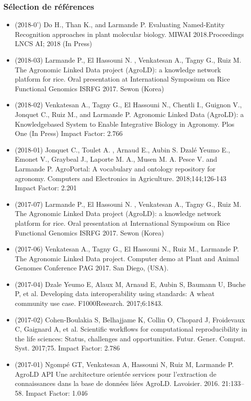 \subsubsection*{Sélection de références} 
\begin{itemize}
\item (2018-0') Do H., Than K., and Larmande P. Evaluating Named-Entity Recognition approaches in plant molecular biology. MIWAI 2018.Proceedings LNCS AI; 2018 (In Press)
\item (2018-03) Larmande P., El Hassouni N. , Venkatesan A., Tagny G., Ruiz M. The Agronomic Linked Data project (AgroLD): a knowledge network platform for rice. Oral presentation at International Symposium on Rice Functional Genomics ISRFG 2017. Sewon (Korea)
\item  (2018-02) Venkatesan A., Tagny G., El Hassouni N., Chentli I., Guignon V., Jonquet C., Ruiz M., and Larmande P. Agronomic Linked Data (AgroLD): a Knowledge\-based System to Enable Integrative Biology in Agronomy. Plos One (In Press) Impact Factor: 2.766
\item (2018-01) Jonquet C.,  Toulet A. , Arnaud E.,  Aubin S. {Dzal{\'{e}} Yeumo} E., Emonet V., Graybeal J., Laporte M. A., Musen M. A. Pesce V. and Larmande P. AgroPortal: A vocabulary and ontology repository for agronomy. Computers and Electronics in Agriculture. 2018;144;126-143 Impact Factor: 2.201
\item (2017-07) Larmande P., El Hassouni N. , Venkatesan A., Tagny G., Ruiz M. The Agronomic Linked Data project (AgroLD): a knowledge network platform for rice. Oral presentation at International Symposium on Rice Functional Genomics ISRFG 2017. Sewon (Korea)
\item (2017-06) Venkatesan A., Tagny G., El Hassouni N., Ruiz M., Larmande P. The Agronomic Linked Data project. Computer demo at Plant and Animal Genomes Conference PAG 2017. San Diego, (USA).
\item (2017-04) Dzale Yeumo E, Alaux M, Arnaud E, Aubin S, Baumann U, Buche P, et al. Developing data interoperability using standards: A wheat community use case. F1000Research. 2017;6:1843.
\item (2017-02) Cohen-Boulakia S, Belhajjame K, Collin O, Chopard J, Froidevaux C, Gaignard A, et al. Scientific workflows for computational reproducibility in the life sciences: Status, challenges and opportunities. Futur. Gener. Comput. Syst. 2017;75. Impact Factor: 2.786
\item (2017-01) Ngompé GT, Venkatesan A, Hassouni N, Ruiz M, Larmande P. AgroLD API Une architecture orientée services pour l’extraction de connaissances dans la base de données liées AgroLD. Lavoisier. 2016. 21:133–58. Impact Factor: 1.046

\end{itemize}
